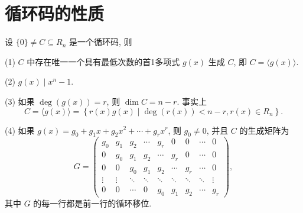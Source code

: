 
\section{循环码的性质}
\begin{theorem}\label{theorem9.2.1}
    设 $ \{0\} \neq C \subseteq R_{n} $ 是一个循环码, 则
    
(1) $ C $ 中存在唯一一个具有最低次数的首1多项式 $ g(x) $ 生成 $ C $, 即 $ C=\langle g(x)\rangle $.

(2) $ g(x) \mid x^{n}-1 $.

(3) 如果 $ \operatorname{deg}(g(x))=r $, 则 $ \operatorname{dim} C=n-r $. 事实上
$$
C=\langle g(x)\rangle=\left\{r(x) g(x) \mid \operatorname{deg}(r(x))<n-r, r(x) \in R_{n}\right\} .
$$

(4) 如果 $ g(x)=g_{0}+g_{1} x+g_{2} x^{2}+\cdots+g_{r} x^{r} $, 则 $ g_{0} \neq 0 $, 并且 $ C $ 的生成矩阵为
$$
G=\left(\begin{array}{ccccccccc}
g_{0} & g_{1} & g_{2} & \cdots & g_{r} & 0 & 0 & \cdots & 0 \\
0 & g_{0} & g_{1} & g_{2} & \cdots & g_{r} & 0 & \cdots & 0 \\
0 & 0 & g_{0} & g_{1} & g_{2} & \cdots & g_{r} & \cdots & 0 \\
\vdots & \vdots & \ddots & \ddots & \ddots & \ddots & \ddots & \ddots & \vdots \\
0 & 0 & \cdots & 0 & g_{0} & g_{1} & g_{2} & \cdots & g_{r}
\end{array}\right),
$$
其中 $ G $ 的每一行都是前一行的循环移位.
\end{theorem}


